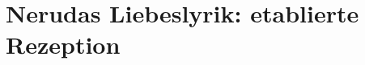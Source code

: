 \section{Nerudas Liebeslyrik: etablierte Rezeption}

\begin{comment}
Stavans zitieren und polemisch einsteigen: "poeta bisexual, hermafrodita, poesía erótica, accpetada y leída tanto por hombres como por mujeres"
http://america.aljazeera.com/articles/2014/6/20/the-unknown-neruda.html
"Likewise, the inspiration of some of the “Twenty Love Poems and a Song of Despair” (1924), including poems XV (“Me gustas cuando callas porque estás como ausente”) and XX (“Puedo escribir los versos más tristes esta noche”), seem — there is no better way to put it! — eternal."
Kann man machen
etablierte Rezepzionsperspektive
ist weit nicht der Einzige
\end{comment}
